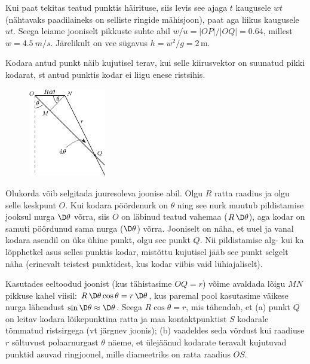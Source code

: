 \documentclass[10pt, twoside]{article}
\begin{document}
{\osa
Kui paat tekitas teatud punktis häirituse, siis levis see ajaga $t$ kaugusele $wt$ (nähtavaks paadilaineks on selliste ringide mähisjoon),
paat aga liikus kaugusele $ut$. Seega leiame jooniselt pikkuste suhte abil $w/u=|OP|/|OQ|=\num{0.64}$, millest $w=\SI{4.5}{m/s}$. Järelikult on vee sügavus
$h=w^2/g=2\,$m.
\probend
\bigskip


\solu
Kodara antud punkt näib kujutisel terav, kui selle kiirusvektor on suunatud pikki kodarat, st antud punktis kodar ei liigu enese ristsihis.

\begin{figure}
	\vspace*{-15pt}
	\includegraphics[width=0.3\textwidth]{2011-lahg-10-kodar_a}
	\vspace*{-25pt}
\end{figure}

Olukorda võib selgitada juuresoleva joonise abil.
Olgu $R$ ratta raadius ja olgu selle keskpunt $O$. Kui kodara pöördenurk on $\theta$ ning see nurk muutub pildistamise jooksul nurga $\D\theta$ võrra,
siis $O$ on läbinud teatud vahemaa ($R \, \D\theta$), aga kodar on samuti pöördunud sama nurga ($\D \theta$) võrra.
Jooniselt on näha, et uuel ja vanal kodara asendil on üks ühine punkt, olgu see punkt $Q$. Nii pildistamise alg- kui ka lõpphetkel asus selles punktis kodar, mistõttu kujutisel jääb see punkt selgelt näha (erinevalt teistest punktidest, kus kodar viibis vaid lühiajaliselt).

Kasutades eeltoodud joonist (kus tähistasime $OQ = r$) võime avaldada lõigu $MN$
pikkuse kahel viisil: $R \,\D \theta \cos \theta = r \,\D \theta$, kus
paremal pool kasutasime väikese nurga lähendust $\sin \D\theta\approx \D\theta$. Seega $R \cos \theta = r$, mis tähendab, et
(a) punkt $Q$ on leitav kodara lõikepunktina ratta ja maa kontaktpunktist $S$ kodarale tõmmatud ristsirgega (vt järgnev joonis);
(b) vaadeldes seda võrdust kui raadiuse $r$ sõltuvust polaarnurgast $\theta$ näeme, et ülejäänud kodarate teravalt kujutuvad punktid asuvad ringjoonel,
mille diameetriks on ratta raadius $OS$.

}
\end{document}
